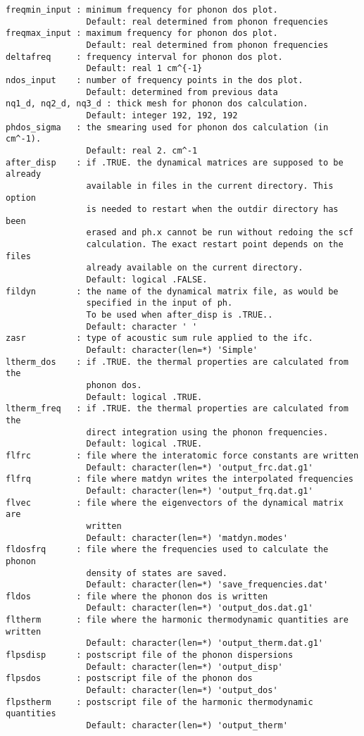 \documentclass[12pt,a4paper]{article}
\begin{document}
\begin{verbatim}
freqmin_input : minimum frequency for phonon dos plot.
                Default: real determined from phonon frequencies
freqmax_input : maximum frequency for phonon dos plot.
                Default: real determined from phonon frequencies
deltafreq     : frequency interval for phonon dos plot.
                Default: real 1 cm^{-1}
ndos_input    : number of frequency points in the dos plot.
                Default: determined from previous data
nq1_d, nq2_d, nq3_d : thick mesh for phonon dos calculation.
                Default: integer 192, 192, 192
phdos_sigma   : the smearing used for phonon dos calculation (in cm^-1).
                Default: real 2. cm^-1
after_disp    : if .TRUE. the dynamical matrices are supposed to be already
                available in files in the current directory. This option
                is needed to restart when the outdir directory has been
                erased and ph.x cannot be run without redoing the scf 
                calculation. The exact restart point depends on the files
                already available on the current directory.
                Default: logical .FALSE.
fildyn        : the name of the dynamical matrix file, as would be 
                specified in the input of ph. 
                To be used when after_disp is .TRUE.. 
                Default: character ' '
zasr          : type of acoustic sum rule applied to the ifc.
                Default: character(len=*) 'Simple'
ltherm_dos    : if .TRUE. the thermal properties are calculated from the 
                phonon dos.
                Default: logical .TRUE.
ltherm_freq   : if .TRUE. the thermal properties are calculated from the
                direct integration using the phonon frequencies.
                Default: logical .TRUE.
flfrc         : file where the interatomic force constants are written
                Default: character(len=*) 'output_frc.dat.g1'
flfrq         : file where matdyn writes the interpolated frequencies
                Default: character(len=*) 'output_frq.dat.g1'
flvec         : file where the eigenvectors of the dynamical matrix are
                written
                Default: character(len=*) 'matdyn.modes'
fldosfrq      : file where the frequencies used to calculate the phonon
                density of states are saved.
                Default: character(len=*) 'save_frequencies.dat'
fldos         : file where the phonon dos is written
                Default: character(len=*) 'output_dos.dat.g1'
fltherm       : file where the harmonic thermodynamic quantities are written
                Default: character(len=*) 'output_therm.dat.g1'
flpsdisp      : postscript file of the phonon dispersions
                Default: character(len=*) 'output_disp'
flpsdos       : postscript file of the phonon dos
                Default: character(len=*) 'output_dos'
flpstherm     : postscript file of the harmonic thermodynamic quantities
                Default: character(len=*) 'output_therm'
\end{verbatim}
\end{document}
